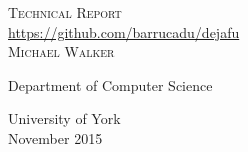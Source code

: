 \begin{titlepage}
\begin{center}

\textsc{\LARGE \dejafu{} Technical Report}\\[0.25cm]

\small{\url{https://github.com/barrucadu/dejafu}}\\[1.5cm]

\textsc{\large Michael Walker}\\[1,5cm]

\vfill

Department of Computer Science\par
University of York \\[1,3cm]

November 2015


\end{center}
\end{titlepage}